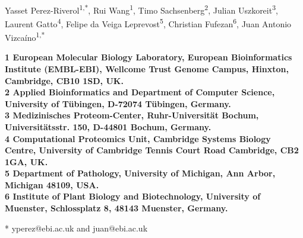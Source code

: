 \documentclass[10pt,letterpaper]{article}
\date{}
\begin{document}
\vspace*{0.35in}

\begin{flushleft}
{\Large
\textbf{}
}
\newline
\\
Yasset Perez-Riverol\textsuperscript{1,*},
Rui Wang\textsuperscript{1},
Timo Sachsenberg\textsuperscript{2},
Julian Uszkoreit\textsuperscript{3},
Laurent Gatto\textsuperscript{4},
Felipe da Veiga Leprevost\textsuperscript{5},
Christian Fufezan\textsuperscript{6},
Juan Antonio Vizcaíno\textsuperscript{1,*}

\bigskip

\bf{1} European Molecular Biology Laboratory, European Bioinformatics
Institute (EMBL-EBI), Wellcome Trust Genome Campus, Hinxton,
Cambridge, CB10 1SD, UK.
\\
\bf{2} Applied Bioinformatics and Department of Computer Science,
University of Tübingen, D-72074 Tübingen, Germany.
\\
\bf{3} Medizinisches Proteom-Center, Ruhr-Universität Bochum,
Universitätsstr. 150, D-44801 Bochum, Germany.
\\
\bf{4} Computational Proteomics Unit, Cambridge Systems Biology
Centre, University of Cambridge Tennis Court Road Cambridge, CB2 1GA,
UK.
\\
\bf{5} Department of Pathology, University of Michigan, Ann Arbor,
Michigan 48109, USA.
\\
\bf{6} Institute of Plant Biology and Biotechnology, University of
Muenster, Schlossplatz 8, 48143 Muenster, Germany.
\bigskip

* yperez@ebi.ac.uk and juan@ebi.ac.uk

\end{flushleft}

\end{document}
